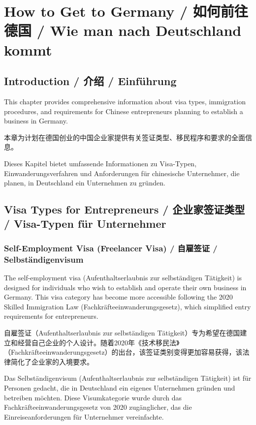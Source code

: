 \chapter{How to Get to Germany / 如何前往德国 / Wie man nach Deutschland kommt}

\section{Introduction / 介绍 / Einführung}

This chapter provides comprehensive information about visa types, immigration procedures, and requirements for Chinese entrepreneurs planning to establish a business in Germany.

本章为计划在德国创业的中国企业家提供有关签证类型、移民程序和要求的全面信息。

Dieses Kapitel bietet umfassende Informationen zu Visa-Typen, Einwanderungsverfahren und Anforderungen für chinesische Unternehmer, die planen, in Deutschland ein Unternehmen zu gründen.

\section{Visa Types for Entrepreneurs / 企业家签证类型 / Visa-Typen für Unternehmer}

\subsection{Self-Employment Visa (Freelancer Visa) / 自雇签证 / Selbständigenvisum}

The self-employment visa (Aufenthaltserlaubnis zur selbständigen Tätigkeit) is designed for individuals who wish to establish and operate their own business in Germany. This visa category has become more accessible following the 2020 Skilled Immigration Law (Fachkräfteeinwanderungsgesetz), which simplified entry requirements for entrepreneurs.

自雇签证（Aufenthaltserlaubnis zur selbständigen Tätigkeit）专为希望在德国建立和经营自己企业的个人设计。随着2020年《技术移民法》（Fachkräfteeinwanderungsgesetz）的出台，该签证类别变得更加容易获得，该法律简化了企业家的入境要求。

Das Selbständigenvisum (Aufenthaltserlaubnis zur selbständigen Tätigkeit) ist für Personen gedacht, die in Deutschland ein eigenes Unternehmen gründen und betreiben möchten. Diese Visumkategorie wurde durch das Fachkräfteeinwanderungsgesetz von 2020 zugänglicher, das die Einreiseanforderungen für Unternehmer vereinfachte.

